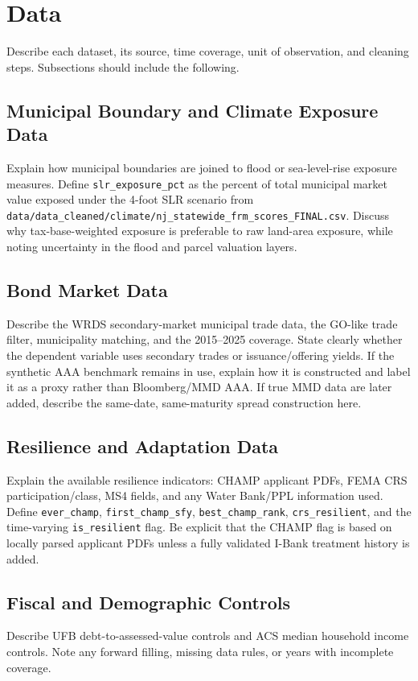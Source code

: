 \documentclass[12pt]{article}
\begin{document}
\section{Data}
Describe each dataset, its source, time coverage, unit of observation, and cleaning steps.
Subsections should include the following.

\subsection{Municipal Boundary and Climate Exposure Data}
Explain how municipal boundaries are joined to flood or sea-level-rise exposure measures.
Define \texttt{slr\_exposure\_pct} as the percent of total municipal market value exposed under the 4-foot SLR scenario from \texttt{data/data\_cleaned/climate/nj\_statewide\_frm\_scores\_FINAL.csv}.
Discuss why tax-base-weighted exposure is preferable to raw land-area exposure, while noting uncertainty in the flood and parcel valuation layers.

\subsection{Bond Market Data}
Describe the WRDS secondary-market municipal trade data, the GO-like trade filter, municipality matching, and the 2015--2025 coverage.
State clearly whether the dependent variable uses secondary trades or issuance/offering yields.
If the synthetic AAA benchmark remains in use, explain how it is constructed and label it as a proxy rather than Bloomberg/MMD AAA.
If true MMD data are later added, describe the same-date, same-maturity spread construction here.

\subsection{Resilience and Adaptation Data}
Explain the available resilience indicators: CHAMP applicant PDFs, FEMA CRS participation/class, MS4 fields, and any Water Bank/PPL information used.
Define \texttt{ever\_champ}, \texttt{first\_champ\_sfy}, \texttt{best\_champ\_rank}, \texttt{crs\_resilient}, and the time-varying \texttt{is\_resilient} flag.
Be explicit that the CHAMP flag is based on locally parsed applicant PDFs unless a fully validated I-Bank treatment history is added.

\subsection{Fiscal and Demographic Controls}
Describe UFB debt-to-assessed-value controls and ACS median household income controls.
Note any forward filling, missing data rules, or years with incomplete coverage.
\end{document}
